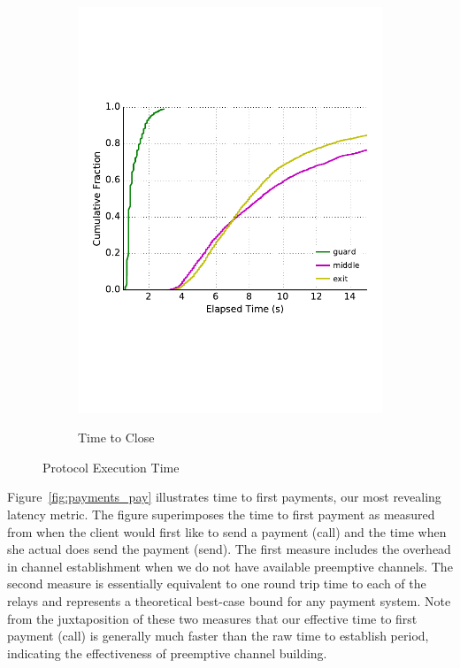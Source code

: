 \begin{figure}
\begin{subfigure}[t]{0.32\textwidth}
\includegraphics[trim={0 3cm 0 3cm}, clip, width=1.0\textwidth]{images/payment_close.pdf}
		\label{fig:stats_c}
		\caption{Time to Close}
	\end{subfigure}
	\label{fig:measurements}
	\caption{Protocol Execution Time}
\end{figure}


Figure~\ref{fig:payments_pay} illustrates time to first payments, our most
revealing latency metric. The figure superimposes the time to first payment as
measured from when the client would first like to send a payment (call) and the
time when she actual does send the payment (send). The first measure includes
the overhead in channel establishment when we do not have available preemptive
channels. The second measure is essentially equivalent to one round trip time to
each of the relays and represents a theoretical best-case bound for any payment
system. Note from the juxtaposition of these two measures that our effective
time to first payment (call) is generally much faster than the raw time to
establish period, indicating the effectiveness of preemptive channel building.

